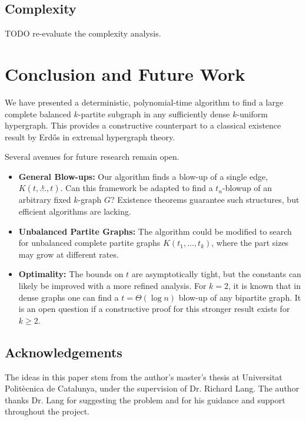 \documentclass[12pt]{article}
\newcommand{\compoverset}[2]{\ensuremath{K(#2, \overset{#1}{\dots}, #2)}}
\newcommand{\compdots}[2]{\ensuremath{K(#1, \dots, #2)}}
\begin{document}
\subsection{Complexity}\label{subsec:complexity}
TODO re-evaluate the complexity analysis. %

\section{Conclusion and Future Work}\label{sec:conclusion-and-future-work}

We have presented a deterministic,
polynomial-time algorithm to find a large complete balanced $k$-partite subgraph in any sufficiently dense $k$-uniform hypergraph.
This provides a constructive counterpart to a classical existence result by Erdős in extremal hypergraph theory.

Several avenues for future research remain open.
\begin{itemize}
    \item \textbf{General Blow-ups:} Our algorithm finds a blow-up of a single edge, $\compoverset{k}{t}$.
    Can this framework be adapted to find a $t_n$-blowup of an arbitrary fixed $k$-graph $G$? Existence theorems guarantee such structures, but efficient algorithms are lacking.
    \item \textbf{Unbalanced Partite Graphs:} The algorithm could be modified to search for unbalanced complete partite graphs $\compdots{t_1}{t_k}$, where the part sizes may grow at different rates.
    \item \textbf{Optimality:} The bounds on $t$ are asymptotically tight, but the constants can likely be improved with a more refined analysis.
    For $k=2$, it is known that in dense graphs one can find a $t=\Theta(\log n)$ blow-up of any bipartite graph.
    It is an open question if a constructive proof for this stronger result exists for $k \ge 2$.
\end{itemize}

\subsection*{Acknowledgements}

The ideas in this paper stem from the author's master's thesis at Universitat Polit\`{e}cnica de Catalunya,
under the supervision of Dr. Richard Lang.
The author thanks Dr. Lang for suggesting the problem and for his guidance and support throughout the project.
\end{document}
